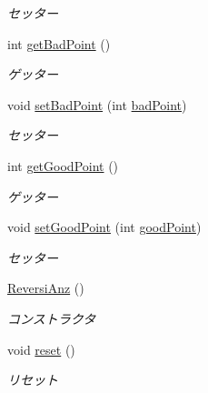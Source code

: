 \begin{DoxyCompactItemize}
\begin{DoxyCompactList}\small\item\em セッター \end{DoxyCompactList}\item 
int \hyperlink{classjp_1_1gr_1_1java__conf_1_1yuta__yoshinaga_1_1reversi_1_1model_1_1_reversi_anz_ad70f21aae68f33fd2b91459bd23005bc}{get\+Bad\+Point} ()
\begin{DoxyCompactList}\small\item\em ゲッター \end{DoxyCompactList}\item 
void \hyperlink{classjp_1_1gr_1_1java__conf_1_1yuta__yoshinaga_1_1reversi_1_1model_1_1_reversi_anz_a1e959a8fa487358c94b7615bdb589e30}{set\+Bad\+Point} (int \hyperlink{classjp_1_1gr_1_1java__conf_1_1yuta__yoshinaga_1_1reversi_1_1model_1_1_reversi_anz_af8bee0a094381bcf50628afe473ef636}{bad\+Point})
\begin{DoxyCompactList}\small\item\em セッター \end{DoxyCompactList}\item 
int \hyperlink{classjp_1_1gr_1_1java__conf_1_1yuta__yoshinaga_1_1reversi_1_1model_1_1_reversi_anz_aeaf13ab6a9399b7621a6726a7cae566f}{get\+Good\+Point} ()
\begin{DoxyCompactList}\small\item\em ゲッター \end{DoxyCompactList}\item 
void \hyperlink{classjp_1_1gr_1_1java__conf_1_1yuta__yoshinaga_1_1reversi_1_1model_1_1_reversi_anz_a50331f4e92029a1cf2ac365eb53f8449}{set\+Good\+Point} (int \hyperlink{classjp_1_1gr_1_1java__conf_1_1yuta__yoshinaga_1_1reversi_1_1model_1_1_reversi_anz_a2be8d7d47c6f3984145e72bb67ad3fb4}{good\+Point})
\begin{DoxyCompactList}\small\item\em セッター \end{DoxyCompactList}\item 
\hyperlink{classjp_1_1gr_1_1java__conf_1_1yuta__yoshinaga_1_1reversi_1_1model_1_1_reversi_anz_a130d4d7b3641a385209d1596c2f3e024}{Reversi\+Anz} ()
\begin{DoxyCompactList}\small\item\em コンストラクタ \end{DoxyCompactList}\item 
void \hyperlink{classjp_1_1gr_1_1java__conf_1_1yuta__yoshinaga_1_1reversi_1_1model_1_1_reversi_anz_ab87a68776fedd66e0fa8bed2c24d461b}{reset} ()
\begin{DoxyCompactList}\small\item\em リセット \end{DoxyCompactList}\end{DoxyCompactItemize}
